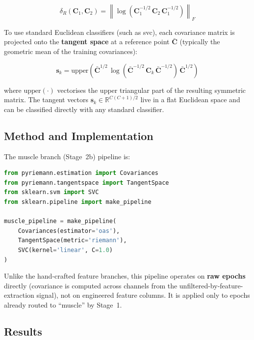 \begin{equation}
\delta_R(\mathbf{C}_1, \mathbf{C}_2) =
\left\lVert \log\!\left(\mathbf{C}_1^{-1/2}\,\mathbf{C}_2\,
\mathbf{C}_1^{-1/2}\right)\right\rVert_F
\label{eq:riemann_dist}
\end{equation}

To use standard Euclidean classifiers (such as \acrshort{svc}),
each covariance matrix is projected onto the \textbf{tangent
space} at a reference point $\bar{\mathbf{C}}$ (typically the
geometric mean of the training covariances):

\begin{equation}
\mathbf{s}_k = \text{upper}\!\left(
\bar{\mathbf{C}}^{1/2}\,
\log\!\left(\bar{\mathbf{C}}^{-1/2}\,\mathbf{C}_k\,
\bar{\mathbf{C}}^{-1/2}\right)\,
\bar{\mathbf{C}}^{1/2}\right)
\label{eq:tangent_space}
\end{equation}

\noindent where $\text{upper}(\cdot)$ vectorises the upper
triangular part of the resulting symmetric matrix. The tangent
vectors $\mathbf{s}_k \in \mathbb{R}^{C(C+1)/2}$ live in a flat
Euclidean space and can be classified directly with any standard
classifier.

\subsection{Method and Implementation}

The muscle branch (Stage~2b) pipeline is:

\begin{lstlisting}[language=Python,
    caption={Riemannian muscle sub-classifier pipeline
    (\code{riemann.py}).},
    label={lst:riemann}]
from pyriemann.estimation import Covariances
from pyriemann.tangentspace import TangentSpace
from sklearn.svm import SVC
from sklearn.pipeline import make_pipeline

muscle_pipeline = make_pipeline(
    Covariances(estimator='oas'),
    TangentSpace(metric='riemann'),
    SVC(kernel='linear', C=1.0)
)
\end{lstlisting}

Unlike the hand-crafted feature branches, this pipeline operates on
\textbf{raw epochs} directly (covariance is computed across
channels from the unfiltered-by-feature-extraction signal), not on
engineered feature columns. It is applied only to epochs already
routed to ``muscle'' by Stage~1.

\subsection{Results}

